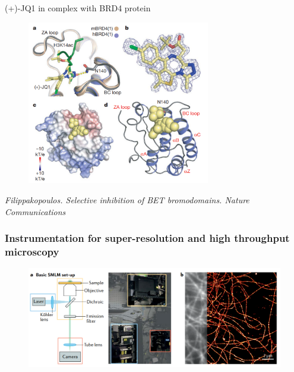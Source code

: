 \documentclass{beamer}					%
\begin{document}
\begin{frame}{(+)-JQ1 in complex with BRD4 protein}
\begin{figure}
\includegraphics[width=8cm]{JQ1.png}
\end{figure}
\textit{Filippakopoulos. Selective inhibition of BET bromodomains. Nature Communications}
\end{frame}

\begin{frame}
\frametitle{Instrumentation for super-resolution and high throughput microscopy}

\begin{figure}
\includegraphics[width=12cm]{Setup.png}
\end{figure}
  
\end{frame}
\end{document}
